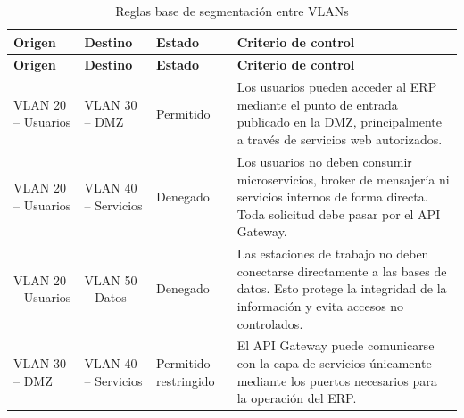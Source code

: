 \documentclass[11pt, a4paper, oneside]{report}
\begin{document}
\begin{xltabular}{\textwidth}{@{}|L{3cm}|L{3cm}|L{2.4cm}|X|@{}}
\caption{Reglas base de segmentación entre VLANs}
\label{tab:reglas_base_segmentacion_vlans} \\

\parbox[c][1.1cm][c]{\linewidth}{\centering\color{white}\bfseries\small Origen} &
\parbox[c][1.1cm][c]{\linewidth}{\centering\color{white}\bfseries\small Destino} &
\parbox[c][1.1cm][c]{\linewidth}{\centering\color{white}\bfseries\small Estado} &
\parbox[c][1.1cm][c]{\linewidth}{\centering\color{white}\bfseries\small Criterio de control} \\ \hline
\endfirsthead

\parbox[c][1.1cm][c]{\linewidth}{\centering\color{white}\bfseries\small Origen} &
\parbox[c][1.1cm][c]{\linewidth}{\centering\color{white}\bfseries\small Destino} &
\parbox[c][1.1cm][c]{\linewidth}{\centering\color{white}\bfseries\small Estado} &
\parbox[c][1.1cm][c]{\linewidth}{\centering\color{white}\bfseries\small Criterio de control} \\ \hline
\endhead

\hline
\endfoot

{\small VLAN 20 -- Usuarios} &
{\small VLAN 30 -- DMZ} &
{\small Permitido} &
{\small Los usuarios pueden acceder al ERP mediante el punto de entrada publicado en la DMZ, principalmente a través de servicios web autorizados.} \\ \hline

{\small VLAN 20 -- Usuarios} &
{\small VLAN 40 -- Servicios} &
{\small Denegado} &
{\small Los usuarios no deben consumir microservicios, broker de mensajería ni servicios internos de forma directa. Toda solicitud debe pasar por el API Gateway.} \\ \hline

{\small VLAN 20 -- Usuarios} &
{\small VLAN 50 -- Datos} &
{\small Denegado} &
{\small Las estaciones de trabajo no deben conectarse directamente a las bases de datos. Esto protege la integridad de la información y evita accesos no controlados.} \\ \hline

{\small VLAN 30 -- DMZ} &
{\small VLAN 40 -- Servicios} &
{\small Permitido restringido} &
{\small El API Gateway puede comunicarse con la capa de servicios únicamente mediante los puertos necesarios para la operación del ERP.} \\ \hline


\end{xltabular}
\end{document}
